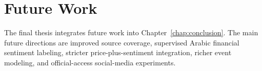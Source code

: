 \chapter{Future Work}
\label{chap:todo}
The final thesis integrates future work into Chapter~\ref{chap:conclusion}. The main future directions are improved source coverage, supervised Arabic financial sentiment labeling, stricter price-plus-sentiment integration, richer event modeling, and official-access social-media experiments.
